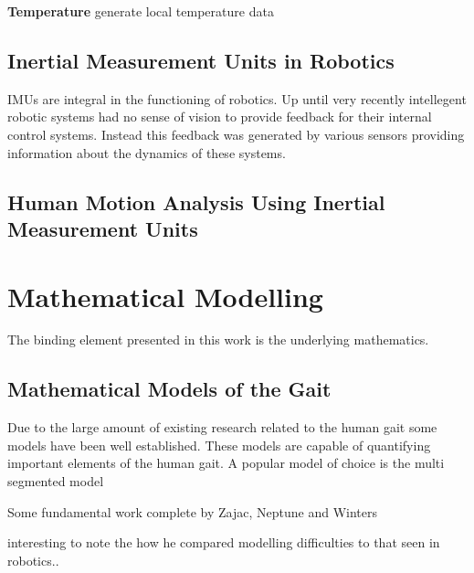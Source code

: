 \textbf{Temperature} generate local temperature data 





\subsection{Inertial Measurement Units in Robotics}
IMUs are integral in the functioning of robotics. Up until very recently intellegent robotic systems  had no sense of vision to provide feedback for their internal control systems. Instead this feedback was generated by various sensors providing information about the dynamics of these systems.










\subsection{Human Motion Analysis Using Inertial Measurement Units}
\cite{picerno201725}










\section{Mathematical Modelling}
The binding element presented in this work is the underlying mathematics.








\subsection{Mathematical Models of the Gait}
Due to the large amount of existing research related to the human gait some models have been well established. These models are capable of quantifying important elements of the human gait. A popular model of choice is the multi segmented model 

Some fundamental work complete by Zajac, Neptune and Winters

\cite{zajac1990modeling} 
interesting to note the how he compared modelling difficulties to that seen in robotics..

\cite{zajac2002biomechanics}


